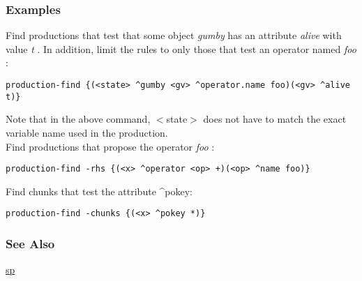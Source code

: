 \subsubsection*{Examples}
 Find productions that test that some object \emph{gumby}
 has an attribute \emph{alive}
 with value \emph{t}
. In addition, limit the rules to only those that test an operator named \emph{foo}
: \begin{verbatim}
production-find {(<state> ^gumby <gv> ^operator.name foo)(<gv> ^alive t)} 
\end{verbatim}
 Note that in the above command, $<$state$>$ does not have to match the exact variable name used in the production. \\ 
 Find productions that propose the operator \emph{foo}
: \begin{verbatim}
production-find -rhs {(<x> ^operator <op> +)(<op> ^name foo)}
\end{verbatim}
 Find chunks that test the attribute \^{}pokey: \begin{verbatim}
production-find -chunks {(<x> ^pokey *)}
\end{verbatim}
\subsubsection*{See Also}
\hyperref[sp]{sp} 